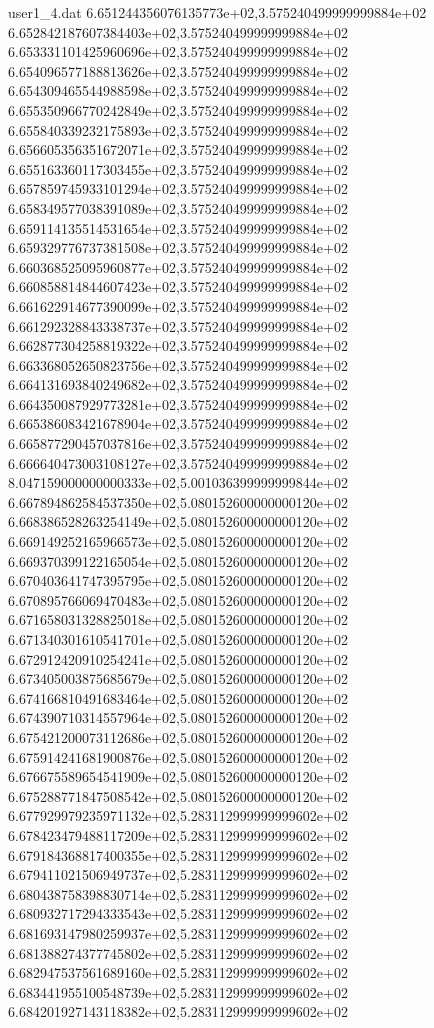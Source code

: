 \begin{filecontents}{user1_4.dat}
6.651244356076135773e+02,3.575240499999999884e+02
6.652842187607384403e+02,3.575240499999999884e+02
6.653331101425960696e+02,3.575240499999999884e+02
6.654096577188813626e+02,3.575240499999999884e+02
6.654309465544988598e+02,3.575240499999999884e+02
6.655350966770242849e+02,3.575240499999999884e+02
6.655840339232175893e+02,3.575240499999999884e+02
6.656605356351672071e+02,3.575240499999999884e+02
6.655163360117303455e+02,3.575240499999999884e+02
6.657859745933101294e+02,3.575240499999999884e+02
6.658349577038391089e+02,3.575240499999999884e+02
6.659114135514531654e+02,3.575240499999999884e+02
6.659329776737381508e+02,3.575240499999999884e+02
6.660368525095960877e+02,3.575240499999999884e+02
6.660858814844607423e+02,3.575240499999999884e+02
6.661622914677390099e+02,3.575240499999999884e+02
6.661292328843338737e+02,3.575240499999999884e+02
6.662877304258819322e+02,3.575240499999999884e+02
6.663368052650823756e+02,3.575240499999999884e+02
6.664131693840249682e+02,3.575240499999999884e+02
6.664350087929773281e+02,3.575240499999999884e+02
6.665386083421678904e+02,3.575240499999999884e+02
6.665877290457037816e+02,3.575240499999999884e+02
6.666640473003108127e+02,3.575240499999999884e+02
8.047159000000000333e+02,5.001036399999999844e+02
6.667894862584537350e+02,5.080152600000000120e+02
6.668386528263254149e+02,5.080152600000000120e+02
6.669149252165966573e+02,5.080152600000000120e+02
6.669370399122165054e+02,5.080152600000000120e+02
6.670403641747395795e+02,5.080152600000000120e+02
6.670895766069470483e+02,5.080152600000000120e+02
6.671658031328825018e+02,5.080152600000000120e+02
6.671340301610541701e+02,5.080152600000000120e+02
6.672912420910254241e+02,5.080152600000000120e+02
6.673405003875685679e+02,5.080152600000000120e+02
6.674166810491683464e+02,5.080152600000000120e+02
6.674390710314557964e+02,5.080152600000000120e+02
6.675421200073112686e+02,5.080152600000000120e+02
6.675914241681900876e+02,5.080152600000000120e+02
6.676675589654541909e+02,5.080152600000000120e+02
6.675288771847508542e+02,5.080152600000000120e+02
6.677929979235971132e+02,5.283112999999999602e+02
6.678423479488117209e+02,5.283112999999999602e+02
6.679184368817400355e+02,5.283112999999999602e+02
6.679411021506949737e+02,5.283112999999999602e+02
6.680438758398830714e+02,5.283112999999999602e+02
6.680932717294333543e+02,5.283112999999999602e+02
6.681693147980259937e+02,5.283112999999999602e+02
6.681388274377745802e+02,5.283112999999999602e+02
6.682947537561689160e+02,5.283112999999999602e+02
6.683441955100548739e+02,5.283112999999999602e+02
6.684201927143118382e+02,5.283112999999999602e+02

\end{filecontents}
